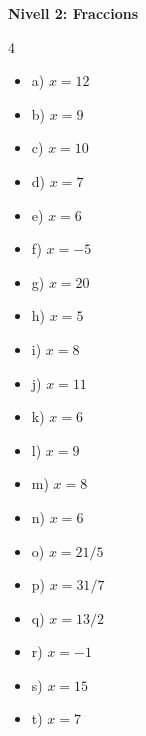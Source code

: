 \documentclass[12pt,a4paper]{article}
\begin{document}
\vspace{0.8cm}

\textbf{Nivell 2: Fraccions}
\begin{multicols}{4}
\begin{itemize}
    \item a) $x = 12$
    \item b) $x = 9$
    \item c) $x = 10$
    \item d) $x = 7$
    \item e) $x = 6$
    \item f) $x = -5$
    \item g) $x = 20$
    \item h) $x = 5$
    \item i) $x = 8$
    \item j) $x = 11$
    \item k) $x = 6$
    \item l) $x = 9$
    \item m) $x = 8$
    \item n) $x = 6$
    \item o) $x = 21/5$
    \item p) $x = 31/7$
    \item q) $x = 13/2$
    \item r) $x = -1$
    \item s) $x = 15$
    \item t) $x = 7$
\end{itemize}
\end{multicols}
\end{document}
